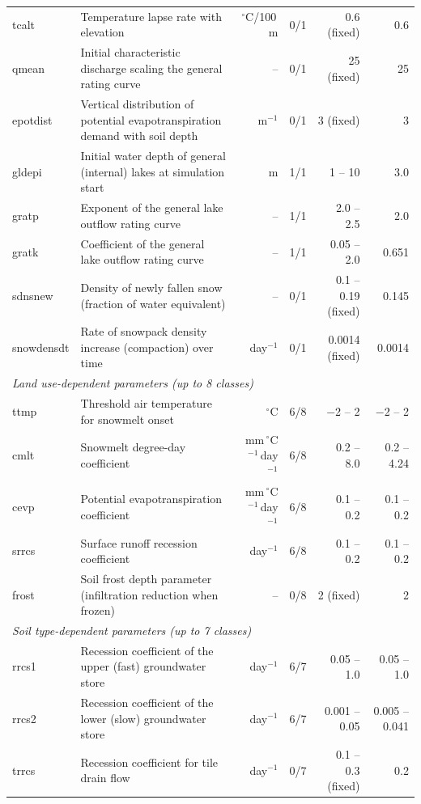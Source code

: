 \documentclass[draft]{agujournal2019}
\begin{document}
\begin{table}[p]
{\begin{tabular}{llrrrr}
tcalt & Temperature lapse rate with elevation & $^\circ$C/100\,m & 0/1 & 0.6 (fixed) & 0.6 \\
qmean & Initial characteristic discharge scaling the general rating curve & -- & 0/1 & 25 (fixed) & 25 \\
epotdist & Vertical distribution of potential evapotranspiration demand with soil depth & m$^{-1}$ & 0/1 & 3 (fixed) & 3 \\
gldepi & Initial water depth of general (internal) lakes at simulation start & m & 1/1 & 1 -- 10 & 3.0 \\
gratp & Exponent of the general lake outflow rating curve & -- & 1/1 & 2.0 -- 2.5 & 2.0 \\
gratk & Coefficient of the general lake outflow rating curve & -- & 1/1 & 0.05 -- 2.0 & 0.651 \\
sdnsnew & Density of newly fallen snow (fraction of water equivalent) & -- & 0/1 & 0.1 -- 0.19 (fixed) & 0.145 \\
snowdensdt & Rate of snowpack density increase (compaction) over time & day$^{-1}$ & 0/1 & 0.0014 (fixed) & 0.0014 \\
\midrule
\multicolumn{6}{l}{\textit{Land use-dependent parameters (up to 8 classes)}} \\
\midrule
ttmp & Threshold air temperature for snowmelt onset & $^\circ$C & 6/8 & $-$2 -- 2 & $-$2 -- 2 \\
cmlt & Snowmelt degree-day coefficient & mm\,$^\circ$C$^{-1}$\,day$^{-1}$ & 6/8 & 0.2 -- 8.0 & 0.2 -- 4.24 \\
cevp & Potential evapotranspiration coefficient & mm\,$^\circ$C$^{-1}$\,day$^{-1}$ & 6/8 & 0.1 -- 0.2 & 0.1 -- 0.2 \\
srrcs & Surface runoff recession coefficient & day$^{-1}$ & 6/8 & 0.1 -- 0.2 & 0.1 -- 0.2 \\
frost & Soil frost depth parameter (infiltration reduction when frozen) & -- & 0/8 & 2 (fixed) & 2 \\
\midrule
\multicolumn{6}{l}{\textit{Soil type-dependent parameters (up to 7 classes)}} \\
\midrule
rrcs1 & Recession coefficient of the upper (fast) groundwater store & day$^{-1}$ & 6/7 & 0.05 -- 1.0 & 0.05 -- 1.0 \\
rrcs2 & Recession coefficient of the lower (slow) groundwater store & day$^{-1}$ & 6/7 & 0.001 -- 0.05 & 0.005 -- 0.041 \\
trrcs & Recession coefficient for tile drain flow & day$^{-1}$ & 0/7 & 0.1 -- 0.3 (fixed) & 0.2 \\

\end{tabular}}
\end{table}
\end{document}
